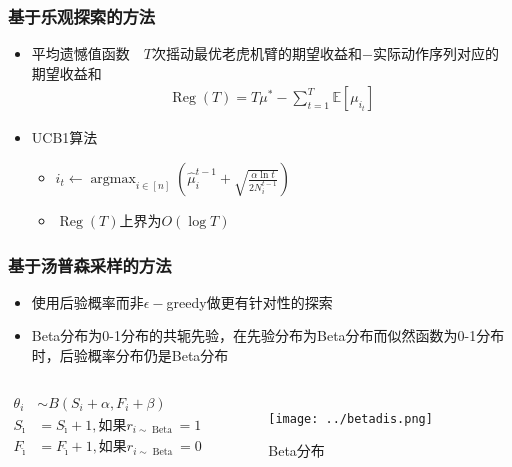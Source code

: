 \documentclass{beamer}
\begin{document}
\begin{CJK*}{GBK}{hei}
\begin{frame}\frametitle{基于乐观探索的方法}
\begin{itemize}
\item 平均遗憾值函数~~$T$次摇动最优老虎机臂的期望收益和$-$实际动作序列对应的期望收益和
\begin{align*}
    \operatorname{Reg}(T)=T \mu^{*}-\sum_{t=1}^{T} \mathbb{E}\left[\mu_{i_{t}}\right]
\end{align*}
\item UCB1算法\citep{Auer2002FinitetimeAO}
{
    \begin{itemize}
        \item $i_{t} \leftarrow \operatorname{argmax}_{i \in[n]}\left(\widehat{\mu}_{i}^{t-1}+\sqrt{\frac{\alpha \ln t}{2 N_{i}^{t-1}}}\right)$
        \item $\operatorname{Reg}(T)$上界为$O(\log T)$
    \end{itemize}
}
\end{itemize}
\end{frame}

\begin{frame}\frametitle{基于汤普森采样的方法}
\begin{itemize}
\item 使用后验概率而非$\epsilon-$greedy做更有针对性的探索\citep{Chapelle2011AnEE}
\item Beta分布为0-1分布的共轭先验，在先验分布为Beta分布而似然函数为0-1分布时，后验概率分布仍是Beta分布
\end{itemize}
\begin{columns}
\begin{align*}
       \theta_{i} &\sim B\left(S_{i}+\alpha, F_{i}+\beta\right)\\
       S_{\hat{\imath}}&=S_{\hat{\imath}}+1, \text{如果}r_{i\sim \operatorname{Beta}}=1\\
       F_{\hat{\imath}}&=F_{\hat{\imath}}+1, \text{如果}r_{i\sim \operatorname{Beta}}=0
\end{align*}
    \begin{figure}[htbp]
        \centering\texttt{[image: ../betadis.png]}
	\caption{Beta分布\citep{astroML}}
    \end{figure}
\end{columns}
\end{frame}


\end{CJK*}
\end{document}

